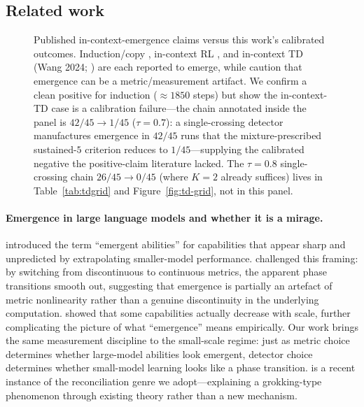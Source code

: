 \documentclass[11pt]{article}
\theoremstyle{plain}
\theoremstyle{definition}
\begin{document}
\subsection{Related work}\label{sec:related}
\begin{figure}[t]
\centering
{}
\caption{Published in-context-emergence claims versus this
work's calibrated outcomes. Induction/copy \citep{olsson2022induction}, in-context RL
\citep{lee2023icrl}, and in-context TD (Wang 2024; \citealp{wang2024tdtransformers}) are each reported
to emerge, while \citet{schaeffer2023mirage} caution that emergence can be a
metric/measurement artifact. We confirm a clean positive for induction
(${\approx}1850$ steps) but show the in-context-TD case is a calibration failure---the
chain annotated inside the panel is $42/45\to1/45$ ($\tau=0.7$): a single-crossing
detector manufactures emergence in $42/45$ runs that the mixture-prescribed sustained-$5$
criterion reduces to $1/45$---supplying the calibrated negative the positive-claim
literature lacked. The $\tau=0.8$ single-crossing chain $26/45\to0/45$ (where $K=2$
already suffices) lives in Table~\ref{tab:tdgrid} and Figure~\ref{fig:td-grid}, not in
this panel.}
\label{fig:landscape}
\end{figure}


\paragraph{Emergence in large language models and whether it is a mirage.}
\citet{wei2022emergent} introduced the term ``emergent abilities'' for capabilities
that appear sharp and unpredicted by extrapolating smaller-model performance.
\citet{schaeffer2023mirage} challenged this framing: by switching from discontinuous
to continuous metrics, the apparent phase transitions smooth out, suggesting that
emergence is partially an artefact of metric nonlinearity rather than a genuine
discontinuity in the underlying computation.
\citet{mckenzie2023inversescaling} showed that some capabilities actually
decrease with scale, further complicating the picture of what ``emergence''
means empirically.
Our work brings the same measurement discipline to the small-scale
regime: just as metric choice determines whether large-model abilities look emergent,
detector choice determines whether small-model learning looks like a phase transition.
\citet{oneto2026} is a recent instance of the reconciliation genre we adopt---explaining a
grokking-type phenomenon through existing theory rather than a new mechanism.
\end{document}
